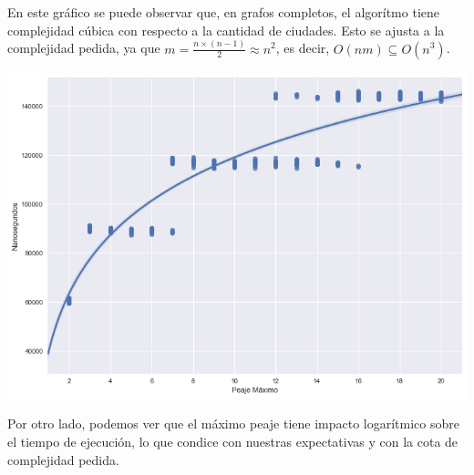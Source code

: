 En este gráfico se puede observar que, en grafos completos, el algorítmo tiene complejidad cúbica con respecto a la cantidad de ciudades. Esto se ajusta a la complejidad pedida, ya que $m = \frac{n \times (n-1)}{2} \approx n^2$, es decir, $O(n m) \subseteq O(n^3)$.

\begin{center}
	\includegraphics[scale=0.5]{imagenes/ej2-2.png}
\end{center}

Por otro lado, podemos ver que el máximo peaje tiene impacto logarítmico sobre el tiempo de ejecución, lo que condice con nuestras expectativas y con la cota de complejidad pedida. 

\pagebreak